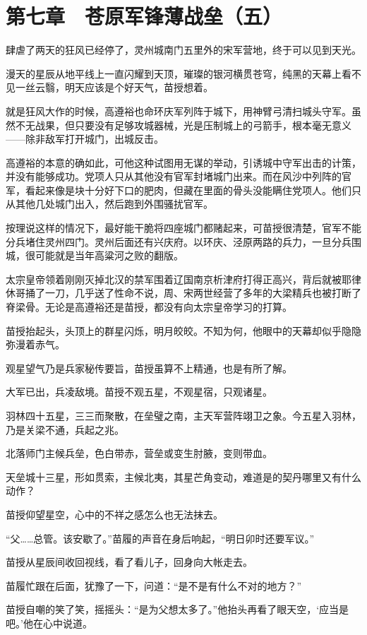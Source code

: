 \section{第七章　苍原军锋薄战垒（五）}

肆虐了两天的狂风已经停了，灵州城南门五里外的宋军营地，终于可以见到天光。

漫天的星辰从地平线上一直闪耀到天顶，璀璨的银河横贯苍穹，纯黑的天幕上看不见一丝云翳，明天应该是个好天气，苗授想着。

就是狂风大作的时候，高遵裕也命环庆军列阵于城下，用神臂弓清扫城头守军。虽然不无战果，但只要没有足够攻城器械，光是压制城上的弓箭手，根本毫无意义——除非敌军打开城门，出城反击。

高遵裕的本意的确如此，可他这种试图用无谋的举动，引诱城中守军出击的计策，并没有能够成功。党项人只从其他没有官军封堵城门出来。而在风沙中列阵的官军，看起来像是块十分好下口的肥肉，但藏在里面的骨头没能瞒住党项人。他们只从其他几处城门出入，然后跑到外围骚扰官军。

按理说这样的情况下，最好能干脆将四座城门都赌起来，可苗授很清楚，官军不能分兵堵住灵州四门。灵州后面还有兴庆府。以环庆、泾原两路的兵力，一旦分兵围城，很可能就是当年高粱河之败的翻版。

太宗皇帝领着刚刚灭掉北汉的禁军围着辽国南京析津府打得正高兴，背后就被耶律休哥捅了一刀，几乎送了性命不说，周、宋两世经营了多年的大梁精兵也被打断了脊梁骨。无论是高遵裕还是苗授，都没有向太宗皇帝学习的打算。

苗授抬起头，头顶上的群星闪烁，明月皎皎。不知为何，他眼中的天幕却似乎隐隐弥漫着赤气。

观星望气乃是兵家秘传要旨，苗授虽算不上精通，也是有所了解。

大军已出，兵凌敌境。苗授不观五星，不观星宿，只观诸星。

羽林四十五星，三三而聚散，在垒璧之南，主天军营阵翊卫之象。今五星入羽林，乃是关梁不通，兵起之兆。

北落师门主候兵垒，色白带赤，营垒或变生肘腋，变则带血。

天垒城十三星，形如贯索，主候北夷，其星芒角变动，难道是的契丹哪里又有什么动作？

苗授仰望星空，心中的不祥之感怎么也无法抹去。

“父……总管。该安歇了。”苗履的声音在身后响起，“明日卯时还要军议。”

苗授从星辰间收回视线，看了看儿子，回身向大帐走去。

苗履忙跟在后面，犹豫了一下，问道：“是不是有什么不对的地方？”

苗授自嘲的笑了笑，摇摇头：“是为父想太多了。”他抬头再看了眼天空，‘应当是吧。’他在心中说道。

